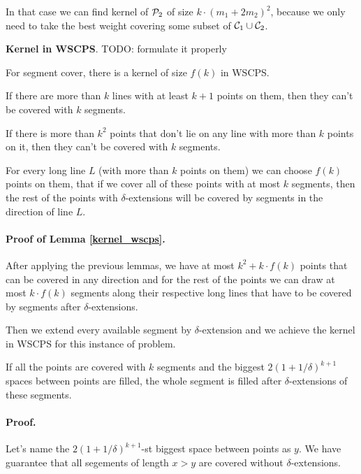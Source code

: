 In that case we can find kernel of $\mathcal{P}_2$ of size $k\cdot(m_1 + 2m_2)^2$,
because we only need to take the best weight covering some subset of $\mathcal{C}_1 \cup \mathcal{C}_2$.

\begin{lemma}
	\label{kernel_wscps}
	\textbf{Kernel in WSCPS}.
	TODO: formulate it properly
	
	For segment cover, there is a kernel of size $f(k)$
	in WSCPS.
\end{lemma}

\begin{claim}
If there are more than $k$ lines with
at least $k+1$ points on them, then 
they can't be covered with $k$ segments.
\end{claim}

\begin{claim}
If there is more than $k^2$ points
that don't lie on any line with more than $k$
points on it, then they can't be covered with $k$ segments.
\end{claim}

\begin{claim}
For every long line $L$ (with more than $k$ points on them)
we can choose $f(k)$ points on them,
that if we cover all of these points with at most $k$
segments, then the rest of the points
with $\delta$-extensions will be covered by
segments in the direction of line $L$.
\end{claim}


\paragraph{Proof of Lemma \ref{kernel_wscps}.}
After applying the previous lemmas,
we have at most $k^2 + k\cdot f(k)$
points that can be covered in any direction
and for the rest of the points we can draw 
at most $k\cdot f(k)$ segments along
their respective long lines that have to be covered
by segments after $\delta$-extensions.

Then we extend every available segment by $\delta$-extension
and we achieve the kernel in WSCPS for this instance of problem.


\begin{lemma}
	\label{covered_spaces_lemma}
	If all the points are covered with $k$ segments and
	the biggest $2(1 + 1/\delta)^{k+1}$ spaces between points
	are filled, the whole segment is filled after
	$\delta$-extensions of these segments.
\end{lemma}
\paragraph{Proof.}
	Let's name the $2(1 + 1/\delta)^{k+1}$-st biggest space
	between points as $y$.
	We have guarantee that all segements of length $x > y$
	are covered without $\delta$-extensions.
	
